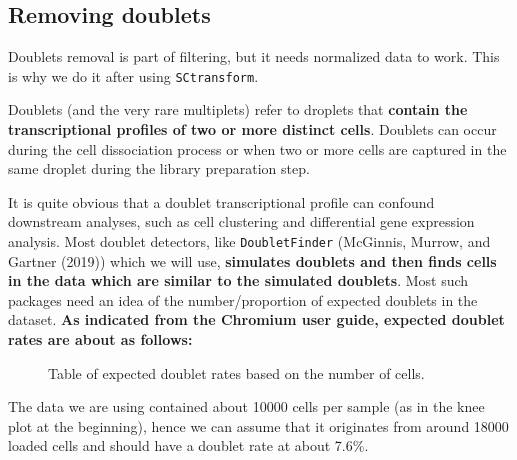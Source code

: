 \documentclass[
  letterpaper,
  DIV=11,
  numbers=noendperiod]{scrartcl}
\begin{document}
\subsection{Removing doublets}\label{removing-doublets}

Doublets removal is part of filtering, but it needs normalized data to
work. This is why we do it after using \texttt{SCtransform}.

Doublets (and the very rare multiplets) refer to droplets that
\textbf{contain the transcriptional profiles of two or more distinct
cells}. Doublets can occur during the cell dissociation process or when
two or more cells are captured in the same droplet during the library
preparation step.

It is quite obvious that a doublet transcriptional profile can confound
downstream analyses, such as cell clustering and differential gene
expression analysis. Most doublet detectors, like \texttt{DoubletFinder}
(McGinnis, Murrow, and Gartner (2019)) which we will use,
\textbf{simulates doublets and then finds cells in the data which are
similar to the simulated doublets}. Most such packages need an idea of
the number/proportion of expected doublets in the dataset. \textbf{As
indicated from the Chromium user guide, expected doublet rates are about
as follows:}

\begin{figure}


\caption{\label{fig-doubletrates}Table of expected doublet rates based
on the number of cells.}

\end{figure}%

The data we are using contained about 10000 cells per sample (as in the
knee plot at the beginning), hence we can assume that it originates from
around 18000 loaded cells and should have a doublet rate at about 7.6\%.
\end{document}
